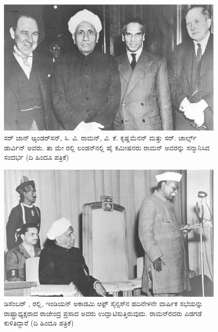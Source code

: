 \begin{figure}[!htbp]
\centering
\includegraphics[scale=0.22]{"images/5.jpg"}
\caption{ಸರ್ ಜಾನ್ ಆ್ಯಂಡರ್‌ಸನ್, ಸಿ. ವಿ. ರಾಮನ್, ವಿ. ಕೆ. ಕೃಷ್ಣಮೆನನ್ ಮತ್ತು ಸರ್. ಚಾರ್ಲ್ಸ್ ಡಾರ್ವಿನ್ ಅವರು. ತಾ  ಮೇ ರಲ್ಲಿ ಲಂಡನ್‍ನಲ್ಲಿ ಹೈ ಕಮೀಷನರು ರಾಮನ್ ಅವರನ್ನು ಸನ್ಮಾನಿಸಿದ ಸಂದರ್ಭ (ದಿ ಹಿಂದೂ ಪತ್ರಿಕೆ)}\label{chap3-fig03}
\end{figure}


\begin{figure}[!htbp]
\centering
\includegraphics[scale=0.22]{"images/6.jpg"}
\caption{ಡಿಸೆಂಬರ್ , ರಲ್ಲಿ, ಇಂಡಿಯನ್ ಅಕಾಡಮಿ ಆಫ಼್ ಸೈನ್ಸಸ್‍ನ ಹದಿನೇಳನೇ ವಾರ್ಷಿಕ ಸಭೆಯನ್ನು ರಾಷ್ಟ್ರಾಧ್ಯಕ್ಷರಾದ ರಾಜೇಂದ್ರ ಪ್ರಸಾದ ಅವರು ಉದ್ಘಾಟಿಸುತ್ತಿರುವುದು. ರಾಮನ್‍ರವರು ಎಡಗಡೆ ಕುಳಿತಿದ್ದಾರೆ (ದಿ ಹಿಂದೂ ಪತ್ರಿಕೆ)}\label{chap3-fig04}
\end{figure}

\clearpage

